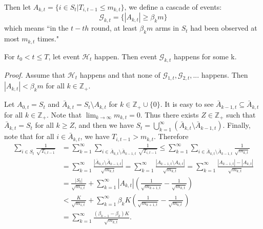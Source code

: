 \documentclass[opre,sglanonrev]{informs4}
\begin{document}
Then let $A_{k,t} = \{i \in S_t|T_{i,t-1}\leq m_{k,t}\}$, we define a cascade of events:
$$\mathcal{G}_{k,t}=\{|A_{k,t}|\geq\beta_k m\}$$
which means “in the $t-th$ round, at least $\beta_{k}m$ arms in $S_{t}$ had been observed at most $m_{k,t}$ times."

\begin{lemma}
    \label{lemma:EC1}
For $t_0<t\leq T$, let event $\mathcal{H}_t$ happen. Then event $\mathcal{G}_{k,t}$ happens for some k.
\end{lemma}

\textit{Proof.} Assume that $\mathcal{H}_t$ happens and that none of $\mathcal{G}_{1,t},\mathcal{G}_{2,t},...$ happens. Then $|A_{k,t}|<\beta_{k}m$ for all $k\in \mathbb{Z}_+$.

Let $A_{0,t} = S_t$ and $\bar{A}_{k,t}=S_t\setminus A_{k,t}$ for $k\in \mathbb{Z}_+\cup \{0\}$. It is easy to see $\bar{A}_{k-1,t}\subseteq\bar{A}_{k,t}$ for all $k\in \mathbb{Z}_+$. Note that $\lim_{k \to \infty}m_{k,t}=0$. Thus there exists $Z\in \mathbb{Z}_+$ such that $\bar{A}_{k,t}=S_t$ for all $k\geq Z$, and then we have $S_t=\bigcup_{k=1}^\infty\left(\bar{A}_{k,t}\setminus\bar{A}_{k-1,t}\right)$. Finally, note that for all $i\in \bar{A}_{k,t}$, we have $T_{i,t-1}>m_{k,t}$. Therefore
$$\begin{aligned}
\sum_{i\in S_t}\frac{1}{\sqrt{T_{i,t-1}}} & =\sum_{k=1}^\infty\sum_{i\in\bar{A}_{k,t}\setminus\bar{A}_{k-1,t}}\frac{1}{\sqrt{T_{i,t-1}}}\leq\sum_{k=1}^\infty\sum_{i\in\bar{A}_{k,t}\setminus\bar{A}_{k-1,t}}\frac{1}{\sqrt{m_{k,t}}} \\
 & =\sum_{k=1}^\infty\frac{\left|\bar{A}_{k,t}\setminus\bar{A}_{k-1,t}\right|}{\sqrt{m_{k,t}}}=\sum_{k=1}^\infty\frac{\left|A_{k-1,t}\setminus A_{k,t}\right|}{\sqrt{m_{k,t}}}=\sum_{k=1}^\infty\frac{\left|A_{k-1,t}\right|-\left|A_{k,t}\right|}{\sqrt{m_{k,t}}} \\
 & =\frac{|S_t|}{\sqrt{m_{1,t}}}+\sum_{k=1}^\infty|A_{k,t}|\left(\frac{1}{\sqrt{m_{k+1,t}}}-\frac{1}{\sqrt{m_{k,t}}}\right) \\
 & <\frac{K}{\sqrt{m_{1,t}}}+\sum_{k=1}^\infty\beta_kK\left(\frac{1}{\sqrt{m_{k+1,t}}}-\frac{1}{\sqrt{m_{k,t}}}\right) \\
 & =\sum_{k=1}^\infty\frac{(\beta_{k-1}-\beta_k)K}{\sqrt{m_{k,t}}}.
\end{aligned}$$
\end{document}
